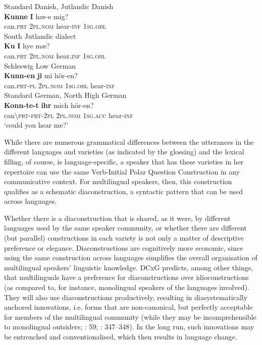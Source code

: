 \documentclass[output=paper]{langsci/langscibook}
\begin{document}
 
\ea\label{ex:hoeder:1}
	\ea \label{ex:hoeder:1a}
	Standard Danish, Jutlandic Danish\\
	\gll \textbf{Kunne} \textbf{I} hør-e mig?\\
     	can.\textsc{prt} \textsc{2pl.nom} hear-\textsc{inf} 1\textsc{sg.obl}\\
	
	\ex\label{ex:hoeder:1b}
		South Jutlandic dialect\\
		\gll \textbf{Ku} \textbf{I} hye mæ?\\
     	can.\textsc{prt} \textsc{2pl.nom} hear.\textsc{inf} 1\textsc{sg.obl}\\
     	
	\ex\label{ex:hoeder:1c}
	 Schleswig Low German\\
	\gll \textbf{Kunn-en} \textbf{ji} mi hör-en?\\
     can.\textsc{prt-pl} 2\textsc{pl.nom} 1\textsc{sg.obl} hear\textsc{{}-inf}\\
     
	\ex\label{ex:hoeder:1d}
	Standard German, North High German\\
	\gll \textbf{Konn-te-t} \textbf{ihr} mich hör-en?\\
     can{\textbackslash}\textsc{prt-prt-}2\textsc{pl} 2\textsc{pl.nom} 1\textsc{sg.acc} hear-\textsc{inf}\\
	\glt `could you hear me?'
\z
\z

While there are numerous grammatical differences between the utterances in the different languages and varieties (as indicated by the glossing) and the lexical filling, of course, is language-specific, a speaker that has these varieties in her repertoire can use the same Verb-Initial Polar Question Construction in any communicative context. For multilingual speakers, then, this construction qualifies as a schematic diaconstruction, a syntactic pattern that can be used across languages.

Whether there is a diaconstruction that is shared, as it were, by different languages used by the same speaker community, or whether there are different (but parallel) constructions in each variety is not only a matter of descriptive preference or elegance. Diaconstructions are cognitively more economic, since using the same construction across languages simplifies the overall organisation of multilingual speakers’ linguistic knowledge. DCxG predicts, among other things, that multilinguals have a preference for diaconstructions over idioconstructions (as compared to, for instance, monolingual speakers of the languages involved). They will also use diaconstructions productively, resulting in diasystematically anchored innovations, i.e. forms that are non-canonical, but perfectly acceptable for members of the multilingual community (while they may be incomprehensible to monolingual outsiders; \citealt{Hoder.2018}: 59; \citeyear{Hoder.2019b}: 347--348). In the long run, such innovations may be entrenched and conventionalised, which then results in language change.
\end{document}
